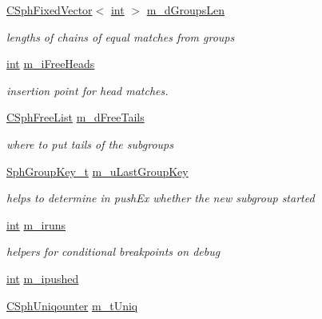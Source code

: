 \begin{DoxyCompactItemize}
\hyperlink{classCSphFixedVector}{C\-Sph\-Fixed\-Vector}$<$ \hyperlink{sphinxexpr_8cpp_a4a26e8f9cb8b736e0c4cbf4d16de985e}{int} $>$ \hyperlink{classCSphKBufferNGroupSorter_ae844b0ff25bad3b3e0bd7cce5b6032d4}{m\-\_\-d\-Groups\-Len}
\begin{DoxyCompactList}\small\item\em lengths of chains of equal matches from groups \end{DoxyCompactList}\item 
\hyperlink{sphinxexpr_8cpp_a4a26e8f9cb8b736e0c4cbf4d16de985e}{int} \hyperlink{classCSphKBufferNGroupSorter_ae16566a58aee6eb3e75a492bade7ceaf}{m\-\_\-i\-Free\-Heads}
\begin{DoxyCompactList}\small\item\em insertion point for head matches. \end{DoxyCompactList}\item 
\hyperlink{classCSphFreeList}{C\-Sph\-Free\-List} \hyperlink{classCSphKBufferNGroupSorter_a3aff535ae49e2be8fd977976bcfe8cfc}{m\-\_\-d\-Free\-Tails}
\begin{DoxyCompactList}\small\item\em where to put tails of the subgroups \end{DoxyCompactList}\item 
\hyperlink{sphinxsort_8cpp_ab18dbc744a7e1518a776845191f194c8}{Sph\-Group\-Key\-\_\-t} \hyperlink{classCSphKBufferNGroupSorter_a52ac5cccf8a5688f84bfa048a322dc0e}{m\-\_\-u\-Last\-Group\-Key}
\begin{DoxyCompactList}\small\item\em helps to determine in push\-Ex whether the new subgroup started \end{DoxyCompactList}\item 
\hyperlink{sphinxexpr_8cpp_a4a26e8f9cb8b736e0c4cbf4d16de985e}{int} \hyperlink{classCSphKBufferNGroupSorter_a699681aaca6fb381c56b824f1844b4e3}{m\-\_\-iruns}
\begin{DoxyCompactList}\small\item\em helpers for conditional breakpoints on debug \end{DoxyCompactList}\item 
\hyperlink{sphinxexpr_8cpp_a4a26e8f9cb8b736e0c4cbf4d16de985e}{int} \hyperlink{classCSphKBufferNGroupSorter_a3308b6c1f46dc67f83b9c032411c5511}{m\-\_\-ipushed}
\item 
\hyperlink{classCSphUniqounter}{C\-Sph\-Uniqounter} \hyperlink{classCSphKBufferNGroupSorter_a2c96c192b433c998ddff586219fbd0a7}{m\-\_\-t\-Uniq}
\item 

\end{DoxyCompactItemize}
